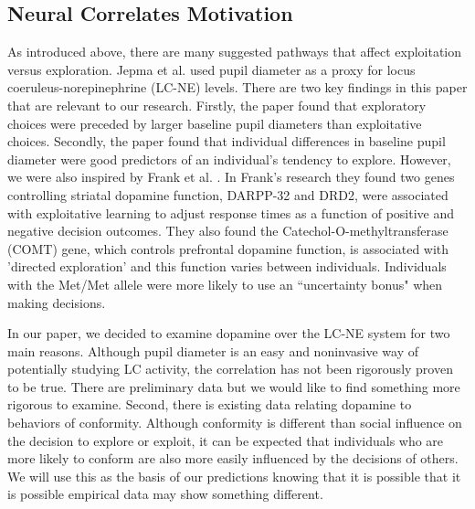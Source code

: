 \documentclass[11pt, a4paper]{article}
\begin{document}
\subsection{Neural Correlates Motivation}
As introduced above, there are many suggested pathways that affect exploitation versus exploration. Jepma et al. \cite{Jepma_2011} used pupil diameter as a proxy for locus coeruleus-norepinephrine (LC-NE) levels. There are two key findings in this paper that are relevant to our research. Firstly, the paper found that exploratory choices were preceded by larger baseline pupil diameters than exploitative choices. Secondly, the paper found that individual differences in baseline pupil diameter were good predictors of an individual's tendency to explore. However, we were also inspired by Frank et al. \cite{Frank2009}. In Frank's research they found two genes controlling striatal dopamine function, DARPP-32 and DRD2, were associated with exploitative learning to adjust response times as a function of positive and negative decision outcomes. They also found the Catechol-O-methyltransferase (COMT) gene, which controls prefrontal dopamine function, is associated with 'directed exploration' and this function varies between individuals. Individuals with the Met/Met allele were more likely to use an ``uncertainty bonus" when making decisions. 

In our paper, we decided to examine dopamine over the LC-NE system for two main reasons. Although pupil diameter is an easy and noninvasive way of potentially studying LC activity, the correlation has not been rigorously proven to be true. There are preliminary data but we would like to find something more rigorous to examine. Second, there is existing data relating dopamine to behaviors of conformity. Although conformity is different than social influence on the decision to explore or exploit, it can be expected that individuals who are more likely to conform are also more easily influenced by the decisions of others. We will use this as the basis of our predictions knowing that it is possible that it is possible empirical data may show something different.
\end{document}
